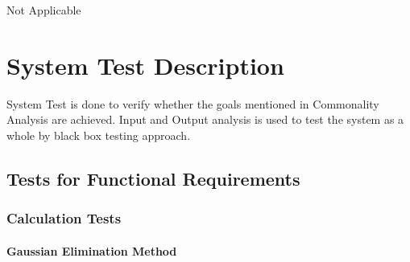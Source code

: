 \documentclass[12pt, titlepage]{article}
\begin{document}
Not Applicable

\section{System Test Description}

System Test is done to verify whether the goals mentioned in Commonality
Analysis are achieved. Input and Output analysis is used to test the system as a
whole by black box testing approach.
	
\subsection{Tests for Functional Requirements}

\subsubsection{Calculation Tests}
		
\paragraph{Gaussian Elimination Method }
\end{document}
